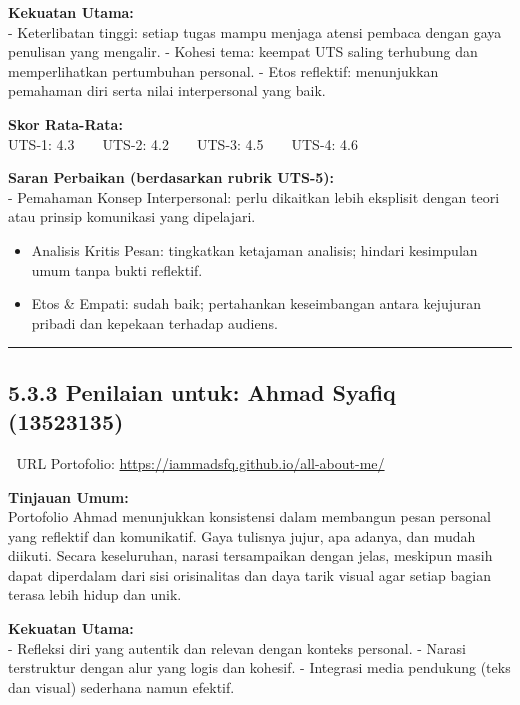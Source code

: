 \documentclass[
  letterpaper,
  DIV=11,
  numbers=noendperiod]{scrreprt}
\begin{document}
\textbf{Kekuatan Utama:}\\
- Keterlibatan tinggi: setiap tugas mampu menjaga atensi pembaca dengan
gaya penulisan yang mengalir. - Kohesi tema: keempat UTS saling
terhubung dan memperlihatkan pertumbuhan personal. - Etos reflektif:
menunjukkan pemahaman diri serta nilai interpersonal yang baik.

\textbf{Skor Rata-Rata:}\\
UTS-1: 4.3 \textbar{} UTS-2: 4.2 \textbar{} UTS-3: 4.5 \textbar{} UTS-4:
4.6

\textbf{Saran Perbaikan (berdasarkan rubrik UTS-5):}\\
- Pemahaman Konsep Interpersonal: perlu dikaitkan lebih eksplisit dengan
teori atau prinsip komunikasi yang dipelajari.

\begin{itemize}
\item
  Analisis Kritis Pesan: tingkatkan ketajaman analisis; hindari
  kesimpulan umum tanpa bukti reflektif.
\item
  Etos \& Empati: sudah baik; pertahankan keseimbangan antara kejujuran
  pribadi dan kepekaan terhadap audiens.
\end{itemize}

\begin{center}\rule{0.5\linewidth}{0.5pt}\end{center}

\subsection{5.3.3 Penilaian untuk: Ahmad Syafiq
(13523135)}\label{penilaian-untuk-ahmad-syafiq-13523135}

🔗 URL Portofolio: \url{https://iammadsfq.github.io/all-about-me/}

\textbf{Tinjauan Umum:}\\
Portofolio Ahmad menunjukkan konsistensi dalam membangun pesan personal
yang reflektif dan komunikatif. Gaya tulisnya jujur, apa adanya, dan
mudah diikuti. Secara keseluruhan, narasi tersampaikan dengan jelas,
meskipun masih dapat diperdalam dari sisi orisinalitas dan daya tarik
visual agar setiap bagian terasa lebih hidup dan unik.

\textbf{Kekuatan Utama:}\\
- Refleksi diri yang autentik dan relevan dengan konteks personal. -
Narasi terstruktur dengan alur yang logis dan kohesif. - Integrasi media
pendukung (teks dan visual) sederhana namun efektif.
\end{document}
